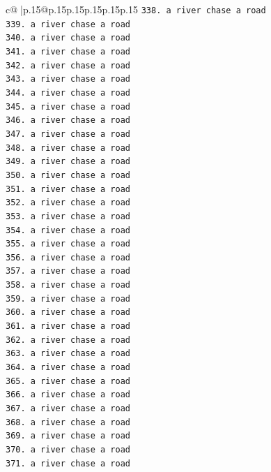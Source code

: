 \documentclass{article}
\begin{document}
{\begin{supertabular}{c@{$\;$}|p{.15\linewidth}@{}p{.15\linewidth}p{.15\linewidth}p{.15\linewidth}p{.15\linewidth}p{.15\linewidth}}
{{{\texttt{338. a river chase a road} \\
\texttt{339. a river chase a road} \\
\texttt{340. a river chase a road} \\
\texttt{341. a river chase a road} \\
\texttt{342. a river chase a road} \\
\texttt{343. a river chase a road} \\
\texttt{344. a river chase a road} \\
\texttt{345. a river chase a road} \\
\texttt{346. a river chase a road} \\
\texttt{347. a river chase a road} \\
\texttt{348. a river chase a road} \\
\texttt{349. a river chase a road} \\
\texttt{350. a river chase a road} \\
\texttt{351. a river chase a road} \\
\texttt{352. a river chase a road} \\
\texttt{353. a river chase a road} \\
\texttt{354. a river chase a road} \\
\texttt{355. a river chase a road} \\
\texttt{356. a river chase a road} \\
\texttt{357. a river chase a road} \\
\texttt{358. a river chase a road} \\
\texttt{359. a river chase a road} \\
\texttt{360. a river chase a road} \\
\texttt{361. a river chase a road} \\
\texttt{362. a river chase a road} \\
\texttt{363. a river chase a road} \\
\texttt{364. a river chase a road} \\
\texttt{365. a river chase a road} \\
\texttt{366. a river chase a road} \\
\texttt{367. a river chase a road} \\
\texttt{368. a river chase a road} \\
\texttt{369. a river chase a road} \\
\texttt{370. a river chase a road} \\
\texttt{371. a river chase a road} \\
}}}
\end{supertabular}}
\end{document}
